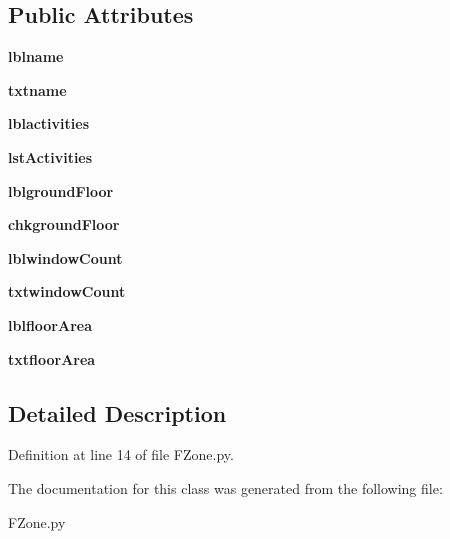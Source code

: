 \subsection*{Public Attributes}
\begin{DoxyCompactItemize}
\item 
\mbox{\label{class_f_zone_1_1_frm_zone_afe9b98e5038ae1c69e5bb7eef0ed7cc4}} 
{\bfseries lblname}
\item 
\mbox{\label{class_f_zone_1_1_frm_zone_a24025fc9f698a9db8fb4f3c1c3c32e40}} 
{\bfseries txtname}
\item 
\mbox{\label{class_f_zone_1_1_frm_zone_af32c698b2c07b5cb5e325c52fe87bd31}} 
{\bfseries lblactivities}
\item 
\mbox{\label{class_f_zone_1_1_frm_zone_a6345e3c5de5cd6dbbd7bfcfc80d84d89}} 
{\bfseries lst\+Activities}
\item 
\mbox{\label{class_f_zone_1_1_frm_zone_a8d1352a3c37302ab5a2bb48e863aa0f4}} 
{\bfseries lblground\+Floor}
\item 
\mbox{\label{class_f_zone_1_1_frm_zone_a12bdd95b96a5e4912083497d98b8bf84}} 
{\bfseries chkground\+Floor}
\item 
\mbox{\label{class_f_zone_1_1_frm_zone_a4c87625a547ea6984a6f464e6d5b04a1}} 
{\bfseries lblwindow\+Count}
\item 
\mbox{\label{class_f_zone_1_1_frm_zone_a78810858635355bfecfd1f8230b52bbf}} 
{\bfseries txtwindow\+Count}
\item 
\mbox{\label{class_f_zone_1_1_frm_zone_a04b1dd26e93ab7acdaaefe7dd99bec10}} 
{\bfseries lblfloor\+Area}
\item 
\mbox{\label{class_f_zone_1_1_frm_zone_a794ba46d7ec1a9ecde741e25379784f0}} 
{\bfseries txtfloor\+Area}
\end{DoxyCompactItemize}


\subsection{Detailed Description}


Definition at line 14 of file F\+Zone.\+py.



The documentation for this class was generated from the following file\+:\begin{DoxyCompactItemize}
\item 
F\+Zone.\+py\end{DoxyCompactItemize}

